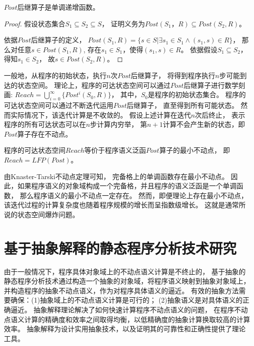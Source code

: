 \begin{lemma}
$Post$后继算子是单调递增函数。
\end{lemma}

\begin{proof}
	假设状态集合$S_1 \subseteq S_2 \subseteq S$，
	证明义务为$Post(S_1， R) \subseteq Post(S_2,R)$。
	
	依据$Post$后继算子的定义，
	$Post(S_1, R) = \{ s\in S | \exists s_1 \in S_1 \wedge (s_1, s)\in R \}$，
	那么对任意$s\in Post(S_1, R)$,
	存在$s_1\in S_1$，使得$(s_1, s)\in R$。
	依据假设$S_1 \subseteq S_2$，得知$s_1 \in S_2$，
	故$s\in Post(S_2, R)$。
\end{proof}


一般地，从程序的初始状态，执行$n$次$Post$后继算子，
将得到程序执行$n$步可能到达的状态空间。
理论上，程序的可达状态空间可以通过$Post$后继算子进行数学刻画:
$Reach = \bigcup_{i=0}^{\infty}\{Post^{i}(S_0, R)\}$，
其中，$S_0$是程序的初始状态集合。
程序的可达状态空间可以通过不断迭代运用$Post$后继算子，
直至得到所有可能状态。
然而实际情况下，该迭代计算是不收敛的。
假设上述计算在迭代$n$次后终止，
表示程序的所有可达状态可以在$n$步计算内穷举，
第$n+1$计算不会产生新的状态，即$Post$算子存在不动点。


\begin{lemma}
程序的可达状态空间$Reach$等价于程序语义泛函$Post$算子的最小不动点，
即$Reach = LFP(Post)$。
\end{lemma}

由Knaster-Tarski不动点定理可知，	完备格上的单调函数存在最小不动点。
因此，如果程序语义的对象域构成一个完备格，并且程序的语义泛函是一个单调函数，
那么程序语义的最小不动点一定存在。
然而，即便理论上存在最小不动点，
该迭代过程的计算复杂度也随着程序规模的增长而呈指数级增长。
这就是通常所说的状态空间爆炸问题。


\section{基于抽象解释的静态程序分析技术研究}
\label{sec-absint}

由于一般情况下，程序具体对象域上的不动点语义计算是不终止的，
基于抽象的静态程序分析技术通过构造一个抽象的对象域，将程序语义映射到抽象对象域上，
并构造程序的抽象不动点语义，作为对程序具体语义的逼近。
有效的抽象方法需要确保：(1)抽象域上的不动点语义计算是可行的；
(2)抽象语义是对具体语义的正确逼近。
抽象解释理论解决了如何快速计算程序不动点语义的问题，
在程序不动点语义计算的精确度和效率之间取得均衡，以低精确度的抽象计算换取较高的计算效率。
抽象解释为设计实用抽象技术，以及证明其的可靠性和正确性提供了理论工具。


